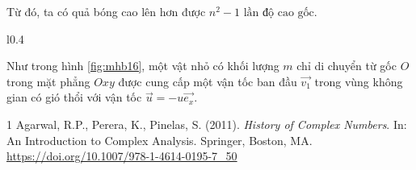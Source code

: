 \documentclass[a4paper, titlepage, openany]{book}
\newcounter{exercise}
\begin{document}
Từ đó, ta có quả bóng cao lên hơn được $\boxed{n^2 - 1 \text{ lần độ cao gốc}}$.

\begin{wrapfigure}{l}{0.4\textwidth} %
   \centering

   \caption{Hình minh họa cho bài \ref{ex:16}}
   \label{fig:mhb16}
\end{wrapfigure}

\exercise[ex:16] Như trong hình \ref{fig:mhb16}, một vật nhỏ có khối lượng $m$ chỉ di chuyển từ gốc $O$ trong mặt phẳng $Oxy$ được cung cấp một vận tốc ban đầu $\overrightarrow{v_1}$ trong vùng không gian có gió thổi với vận tốc $\vec{u} = -u \overrightarrow{e_x}$.



\begin{thebibliography}{1}
Agarwal, R.P., Perera, K., Pinelas, S. (2011). \textit{History of Complex Numbers}. In: An Introduction to Complex Analysis. Springer, Boston, MA. \url{https://doi.org/10.1007/978-1-4614-0195-7_50}
\end{thebibliography}
\end{document}
